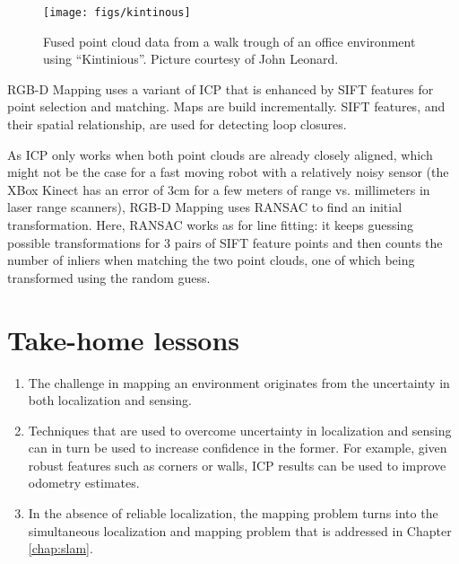 \begin{figure}
    \centering
    \texttt{[image: figs/kintinous]}
    \caption{Fused point cloud data from a walk trough of an office environment using ``Kintinious''. Picture courtesy of John Leonard.\label{fig:kintinous}}
\end{figure}

RGB-D Mapping uses a variant of ICP that is enhanced by SIFT features for point selection and matching. Maps are build incrementally. SIFT features, and their spatial relationship, are used for detecting loop closures. %

As ICP only works when both point clouds are already closely aligned, which might not be the case for a fast moving robot with a relatively noisy sensor (the XBox Kinect has an error of 3cm for a few meters of range vs. millimeters in laser range scanners), RGB-D Mapping uses RANSAC to find an initial transformation. Here, RANSAC works as for line fitting: it keeps guessing possible transformations for 3 pairs of SIFT feature points and then counts the number of inliers when matching the two point clouds, one of which being transformed using the random guess.


\section*{Take-home lessons}
\begin{enumerate}
\item The challenge in mapping an environment originates from the uncertainty in both localization and sensing.
\item Techniques that are used to overcome uncertainty in localization and sensing can in turn be used to increase confidence in the former. For example, given robust features such as corners or walls, ICP results can be used to improve odometry estimates.
\item In the absence of reliable localization, the mapping problem turns into the simultaneous localization and mapping problem that is addressed in Chapter \ref{chap:slam}.
\end{enumerate}

